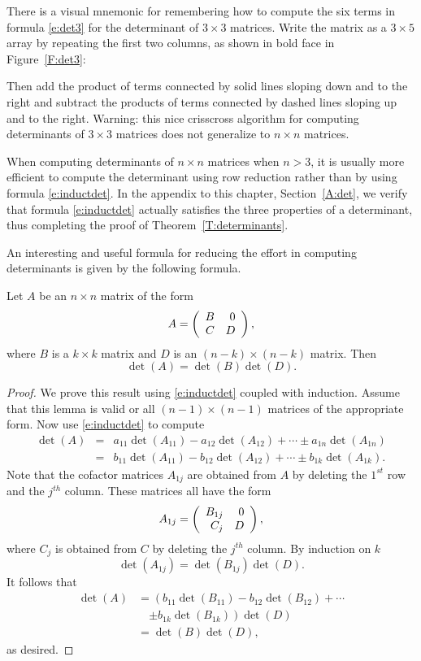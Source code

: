 \documentclass{ximera}
\begin{document}
There is a visual mnemonic for remembering how to compute the six
terms in formula \eqref{e:det3} for the determinant of 
$3\times 3$ matrices.
Write the matrix as a $3\times 5$ array by repeating the first 
two columns, as shown in bold face in Figure~\ref{F:det3}:
\begin{figure*}[htb]
           \centerline{%
            }
           \caption{Mnemonic for computation of determinants of 
		$3\times 3$ matrices.}
           \label{F:det3}
\end{figure*}
Then add the product of terms connected by solid lines sloping down and 
to the right and subtract the products of terms connected by dashed lines 
sloping up and to the right.  Warning: this nice crisscross algorithm 
for computing determinants of $3\times 3$ matrices does not generalize 
to $n\times n$ matrices.
 
When computing determinants of $n\times n$ matrices when $n>3$,
it is usually more efficient to compute the determinant using row
reduction rather than by using formula \eqref{e:inductdet}.  In the
appendix to this chapter, Section~\ref{A:det}, we verify that formula 
\eqref{e:inductdet} actually satisfies the three properties of a determinant, 
thus completing the proof of Theorem~\ref{T:determinants}.  

An interesting and useful formula for reducing the effort in 
computing determinants is given by the following formula.
\begin{lemma} \label{L:detblockdiag}
Let $A$ be an $n\times n$ matrix of the form
\[
A=\left(\begin{array}{rr} B & 0\\ C &D\end{array}\right),
\]
where $B$ is a $k\times k$ matrix and $D$ is an $(n-k)\times(n-k)$
matrix.  Then
\[
\det(A)=\det(B)\det(D).
\]
\end{lemma}

\begin{proof} We prove this result using \eqref{e:inductdet} coupled with 
induction. Assume that this lemma is valid or all $(n-1)\times
(n-1)$ matrices of the appropriate form.  Now use
\eqref{e:inductdet} to compute
\begin{eqnarray*}
\det(A) & = & a_{11}\det(A_{11})-a_{12}\det(A_{12}) + \cdots\pm
a_{1n}\det(A_{1n}) \\
& = &  b_{11}\det(A_{11})-b_{12}\det(A_{12}) + \cdots\pm
b_{1k}\det(A_{1k}).
\end{eqnarray*}
Note that the cofactor matrices $A_{1j}$ are obtained from $A$
by deleting the $1^{st}$ row and the $j^{th}$ column.  These
matrices all have the form
\[
A_{1j} = \left(\begin{array}{rr} B_{1j} & 0\\ C_j &D\end{array}\right),
\]
where $C_j$ is obtained from $C$ by deleting the $j^{th}$
column. By induction on $k$
\[
\det(A_{1j}) = \det(B_{1j})\det(D).
\]
It follows that 
\begin{align*}
  \det(A) & = \left(b_{11}\det(B_{11})-b_{12}\det(B_{12}) + \cdots \right. \\
  &\quad \left. \pm
b_{1k}\det(B_{1k})\right)\det(D) \\
& = \det(B)\det(D),
\end{align*}
as desired.  \end{proof}
\end{document}
